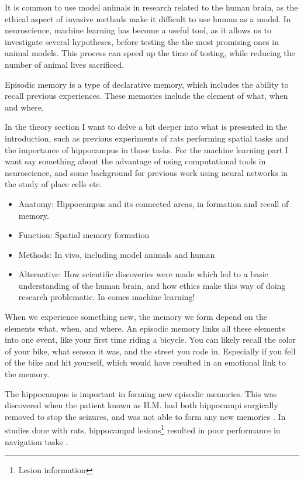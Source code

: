 It is common to use model animals in research related to the human brain, as the ethical aspect of invasive methods make it difficult to use human as a model. In neuroscience, machine learning has become a useful tool, as it allows us to investigate several hypotheses, before testing the the most promising ones in animal models. This process can speed up the time of testing, while reducing the number of animal lives sacrificed.

Episodic memory is a type of declarative memory, which includes the ability to recall previous experiences. These memories include the element of what, when and where, 


In the theory section I want to delve a bit deeper into what is presented in 
the introduction, such as previous experiments of rats performing spatial 
tasks and the importance of hippocampus in those tasks. For the machine 
learning part I want say something about the advantage of using computational 
tools in neuroscience, and some background for previous work using neural 
networks in the study of place cells etc.
\begin{itemize}
    \item Anatomy: Hippocampus and its connected areas, in formation and recall of memory.
    \item Function: Spatial memory formation
    \item Methods: In vivo, including model animals and human
    \item Alternative: How scientific discoveries were made which led to a basic understanding of the human brain, and how ethics make this way of doing research problematic. In comes machine learning!
\end{itemize}
When we experience something new, the memory we form depend on the elements what, when, and where. An episodic memory links all these elements into one event, like your first time riding a bicycle. You can likely recall the color of your bike, what season it was, and the street you rode in. Especially if you fell of the bike and hit yourself, which would have resulted in an emotional link to the memory.

The hippocampus is important in forming new episodic memories. This was discovered when the patient known as H.M. had both hippocampi surgically removed to stop the seizures, and was not able to form any new memories \cite{scoville:1957:loss_recent}. In studies done with rats, hippocampal lesions\footnote{Lesion information} resulted in poor performance in navigation tasks \cite{kaada:1961:maze, schlesiger:2013:hippocampal_activation_maze}. 

